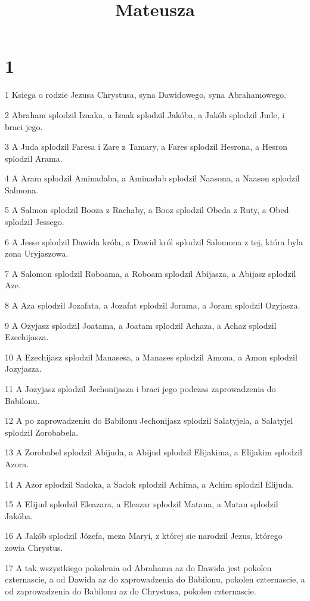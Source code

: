

\title{Mateusza}


\chapter{1}

\par 1 Ksiega o rodzie Jezusa Chrystusa, syna Dawidowego, syna Abrahamowego.
\par 2 Abraham splodzil Izaaka, a Izaak splodzil Jakóba, a Jakób splodzil Jude, i braci jego.
\par 3 A Juda splodzil Faresa i Zare z Tamary, a Fares splodzil Hesrona, a Hesron splodzil Arama.
\par 4 A Aram splodzil Aminadaba, a Aminadab splodzil Naasona, a Naason splodzil Salmona.
\par 5 A Salmon splodzil Booza z Rachaby, a Booz splodzil Obeda z Ruty, a Obed splodzil Jessego.
\par 6 A Jesse splodzil Dawida króla, a Dawid król splodzil Salomona z tej, która byla zona Uryjaszowa.
\par 7 A Salomon splodzil Roboama, a Roboam splodzil Abijasza, a Abijasz splodzil Aze.
\par 8 A Aza splodzil Jozafata, a Jozafat splodzil Jorama, a Joram splodzil Ozyjasza.
\par 9 A Ozyjasz splodzil Joatama, a Joatam splodzil Achaza, a Achaz splodzil Ezechijasza.
\par 10 A Ezechijasz splodzil Manasesa, a Manases splodzil Amona, a Amon splodzil Jozyjasza.
\par 11 A Jozyjasz splodzil Jechonijasza i braci jego podczas zaprowadzenia do Babilonu.
\par 12 A po zaprowadzeniu do Babilonu Jechonijasz splodzil Salatyjela, a Salatyjel splodzil Zorobabela.
\par 13 A Zorobabel splodzil Abijuda, a Abijud splodzil Elijakima, a Elijakim splodzil Azora.
\par 14 A Azor splodzil Sadoka, a Sadok splodzil Achima, a Achim splodzil Elijuda.
\par 15 A Elijud splodzil Eleazara, a Eleazar splodzil Matana, a Matan splodzil Jakóba.
\par 16 A Jakób splodzil Józefa, meza Maryi, z której sie narodzil Jezus, którego zowia Chrystus.
\par 17 A tak wszystkiego pokolenia od Abrahama az do Dawida jest pokolen czternascie, a od Dawida az do zaprowadzenia do Babilonu, pokolen czternascie, a od zaprowadzenia do Babilonu az do Chrystusa, pokolen czternascie.

